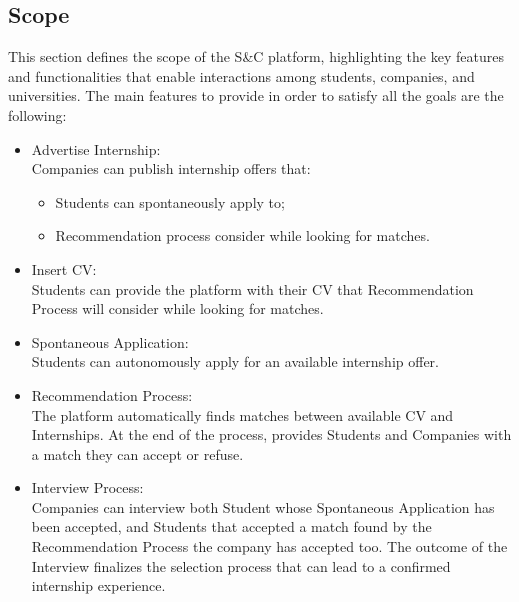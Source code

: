 \subsection{Scope}
This section defines the scope of the S\&C platform, highlighting the key features and functionalities that enable interactions among students, companies, and universities.
The main features to provide in order to satisfy all the goals are the following:
\begin{itemize}
\item {\color{titleColor}Advertise Internship:}\\ Companies can publish internship offers that:
    \begin{itemize}
        \item Students can spontaneously apply to;
        \item Recommendation process consider while looking for matches.
    \end{itemize}
\item {\color{titleColor}Insert CV:}\\ Students can provide the platform with their CV that Recommendation Process will consider while looking for matches.
\item {\color{titleColor}Spontaneous Application:}\\ Students can autonomously apply for an available internship offer.
\item {\color{titleColor}Recommendation Process:}\\ The platform automatically finds matches between available CV and Internships. At the end of the process, provides Students and Companies with a match they can accept or refuse.
\item {\color{titleColor}Interview Process:}\\
    Companies can interview both Student whose Spontaneous Application has been accepted, and Students that accepted a match found by the Recommendation Process the company has accepted too. The outcome of the Interview finalizes the selection process that can lead to a confirmed internship experience.  

\end{itemize}
